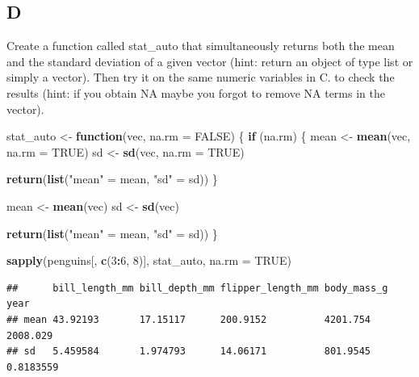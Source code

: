 \documentclass[
]{article}
\newenvironment{Shaded}{\begin{snugshade}}{\end{snugshade}}
\newcommand{\AttributeTok}[1]{\textcolor[rgb]{0.13,0.29,0.53}{#1}}
\newcommand{\ConstantTok}[1]{\textcolor[rgb]{0.56,0.35,0.01}{#1}}
\newcommand{\ControlFlowTok}[1]{\textcolor[rgb]{0.13,0.29,0.53}{\textbf{#1}}}
\newcommand{\DecValTok}[1]{\textcolor[rgb]{0.00,0.00,0.81}{#1}}
\newcommand{\FunctionTok}[1]{\textcolor[rgb]{0.13,0.29,0.53}{\textbf{#1}}}
\newcommand{\NormalTok}[1]{#1}
\newcommand{\OtherTok}[1]{\textcolor[rgb]{0.56,0.35,0.01}{#1}}
\newcommand{\SpecialCharTok}[1]{\textcolor[rgb]{0.81,0.36,0.00}{\textbf{#1}}}
\newcommand{\StringTok}[1]{\textcolor[rgb]{0.31,0.60,0.02}{#1}}
\begin{document}
\hypertarget{d}{%
\subsection{D}\label{d}}

Create a function called stat\_auto that simultaneously returns both the
mean and the standard deviation of a given vector (hint: return an
object of type list or simply a vector). Then try it on the same numeric
variables in C. to check the results (hint: if you obtain NA maybe you
forgot to remove NA terms in the vector).

\begin{Shaded}
\begin{Highlighting}[]
\NormalTok{stat\_auto }\OtherTok{\textless{}{-}} \ControlFlowTok{function}\NormalTok{(vec, }\AttributeTok{na.rm =} \ConstantTok{FALSE}\NormalTok{) \{}
  \ControlFlowTok{if}\NormalTok{ (na.rm) \{}
\NormalTok{    mean }\OtherTok{\textless{}{-}} \FunctionTok{mean}\NormalTok{(vec, }\AttributeTok{na.rm =} \ConstantTok{TRUE}\NormalTok{)}
\NormalTok{    sd }\OtherTok{\textless{}{-}} \FunctionTok{sd}\NormalTok{(vec, }\AttributeTok{na.rm =} \ConstantTok{TRUE}\NormalTok{)}

    \FunctionTok{return}\NormalTok{(}\FunctionTok{list}\NormalTok{(}\StringTok{"mean"} \OtherTok{=}\NormalTok{ mean, }\StringTok{"sd"} \OtherTok{=}\NormalTok{ sd))}
\NormalTok{  \}}

\NormalTok{  mean }\OtherTok{\textless{}{-}} \FunctionTok{mean}\NormalTok{(vec)}
\NormalTok{  sd }\OtherTok{\textless{}{-}} \FunctionTok{sd}\NormalTok{(vec)}

  \FunctionTok{return}\NormalTok{(}\FunctionTok{list}\NormalTok{(}\StringTok{"mean"} \OtherTok{=}\NormalTok{ mean, }\StringTok{"sd"} \OtherTok{=}\NormalTok{ sd))}
\NormalTok{\}}

\FunctionTok{sapply}\NormalTok{(penguins[, }\FunctionTok{c}\NormalTok{(}\DecValTok{3}\SpecialCharTok{:}\DecValTok{6}\NormalTok{, }\DecValTok{8}\NormalTok{)], stat\_auto, }\AttributeTok{na.rm =} \ConstantTok{TRUE}\NormalTok{)}
\end{Highlighting}
\end{Shaded}

\begin{verbatim}
##      bill_length_mm bill_depth_mm flipper_length_mm body_mass_g year     
## mean 43.92193       17.15117      200.9152          4201.754    2008.029 
## sd   5.459584       1.974793      14.06171          801.9545    0.8183559
\end{verbatim}
\end{document}
